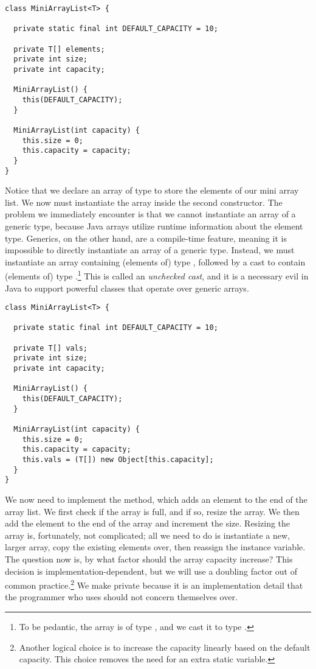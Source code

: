 \begin{lstlisting}[language=MyJava]
class MiniArrayList<T> {

  private static final int DEFAULT_CAPACITY = 10;

  private T[] elements;
  private int size;
  private int capacity;

  MiniArrayList() { 
    this(DEFAULT_CAPACITY); 
  }

  MiniArrayList(int capacity) {
    this.size = 0;
    this.capacity = capacity;
  }
}
\end{lstlisting}

Notice that we declare an array of type  to store the elements of our mini array list. We now must instantiate the array inside the second constructor. 
The problem we immediately encounter is that we cannot instantiate an array of a generic type, because Java arrays utilize runtime information about the element type. 
Generics, on the other hand, are a compile-time feature, meaning it is impossible to directly instantiate an array of a generic type. 
Instead, we must instantiate an array containing (elements of) type , followed by a cast to contain (elements of) type .\footnote{To be pedantic, the array is of type , and we cast it to type .} 
This is called an \emph{unchecked cast}, and it is a necessary evil in Java to support powerful classes that operate over generic arrays.

\begin{lstlisting}[language=MyJava]
class MiniArrayList<T> {

  private static final int DEFAULT_CAPACITY = 10;

  private T[] vals;
  private int size;
  private int capacity;

  MiniArrayList() { 
    this(DEFAULT_CAPACITY); 
  }

  MiniArrayList(int capacity) {
    this.size = 0;
    this.capacity = capacity;
    this.vals = (T[]) new Object[this.capacity];
  }
}
\end{lstlisting}

We now need to implement the  method, which adds an element to the end of the array list. 
We first check if the array is full, and if so, resize the array. 
We then add the element to the end of the array and increment the size. 
Resizing the array is, fortunately, not complicated; all we need to do is instantiate a new, larger array, copy the existing elements over, then reassign the instance variable. 
The question now is, by what factor should the array capacity increase? 
This decision is implementation-dependent, but we will use a doubling factor out of common practice.\footnote{Another logical choice is to increase the capacity linearly based on the default capacity. This choice removes the need for an extra static variable.} 
We make  private because it is an implementation detail that the programmer who uses  should not concern themselves over. 

